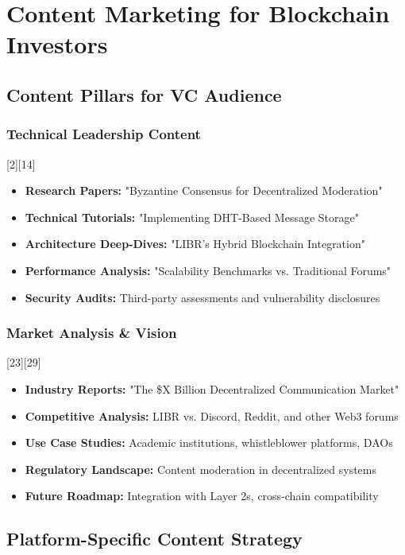 \documentclass[12pt,a4paper]{article}
\begin{document}
\section{Content Marketing for Blockchain Investors}

\subsection{Content Pillars for VC Audience}

\subsubsection{Technical Leadership Content}[2][14]
\begin{itemize}
    \item \textbf{Research Papers:} "Byzantine Consensus for Decentralized Moderation"
    \item \textbf{Technical Tutorials:} "Implementing DHT-Based Message Storage"
    \item \textbf{Architecture Deep-Dives:} "LIBR's Hybrid Blockchain Integration"
    \item \textbf{Performance Analysis:} "Scalability Benchmarks vs. Traditional Forums"
    \item \textbf{Security Audits:} Third-party assessments and vulnerability disclosures
\end{itemize}

\subsubsection{Market Analysis \& Vision}[23][29]
\begin{itemize}
    \item \textbf{Industry Reports:} "The \$X Billion Decentralized Communication Market"
    \item \textbf{Competitive Analysis:} LIBR vs. Discord, Reddit, and other Web3 forums
    \item \textbf{Use Case Studies:} Academic institutions, whistleblower platforms, DAOs
    \item \textbf{Regulatory Landscape:} Content moderation in decentralized systems
    \item \textbf{Future Roadmap:} Integration with Layer 2s, cross-chain compatibility
\end{itemize}

\subsection{Platform-Specific Content Strategy}
\end{document}
